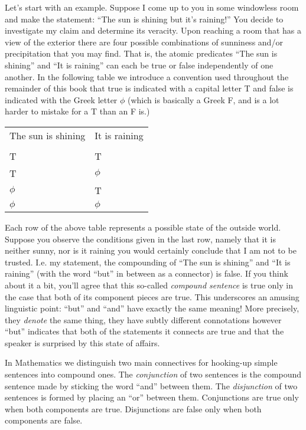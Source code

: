 \documentclass[10pt,]{book}
\theoremstyle{plain}
\theoremstyle{definition}
\theoremstyle{definition}
\numberwithin{equation}{section}
\newcommand{\hrulethin}  {\noalign{\hrule height 0.04em}}
\begin{document}
    Let's start with an example. Suppose I come up to you in some windowless
    room and make the statement: ``The sun is shining but it's raining!''
    You decide to investigate my claim and determine its veracity. Upon
    reaching a room that has a view of the exterior there are four possible
    combinations of sunniness and/or precipitation that you may find. That is,
    the atomic predicates ``The sun is shining'' and ``It is raining'' can each
    be true or false independently of one another. In the following table
    we introduce a convention used throughout the remainder of this book \textemdash{} that true is indicated with a capital letter T and false is indicated
    with the Greek letter \(\phi\) (which is basically a Greek F, and is a lot harder
    to mistake for a T than an F is.)
\begin{tabular}{ll}
The sun is shining&It is raining\tabularnewline[0pt]
&\tabularnewline\hrulethin
T&T\tabularnewline[0pt]
T&\(\phi\)\tabularnewline[0pt]
\(\phi\)&T\tabularnewline[0pt]
\(\phi\)&\(\phi\)
\end{tabular}
\par

    Each row of the above table represents a possible state of the outside
    world. Suppose you observe the conditions given in the last row, namely
    that it is neither sunny, nor is it raining \textemdash{} you would certainly conclude
    that I am not to be trusted. I.e. my statement, the compounding of
    ``The sun is shining'' and ``It is raining'' (with the word ``but'' in between
    as a connector) is false. If you think about it a bit, you'll agree that
    this so-called \emph{compound sentence} is true
    only in the case that both
    of its component pieces are true. This underscores an amusing linguistic
    point: ``but'' and ``and'' have exactly the same meaning! More precisely,
    they \emph{denote} the same thing, they have subtly different connotations
    however \textemdash{} ``but'' indicates that both of the statements it connects
    are true and that the speaker is surprised by this state of affairs.
\par

    In Mathematics we distinguish two main connectives for hooking-up simple
    sentences into compound ones. The \emph{conjunction}
    of two sentences is
    the compound sentence made by sticking the word ``and'' between them.
    The \emph{disjunction} of two sentences is
    formed by placing an ``or''
    between them. Conjunctions are true only when both components are true.
    Disjunctions are false only when both components are false.
\par
\end{document}
